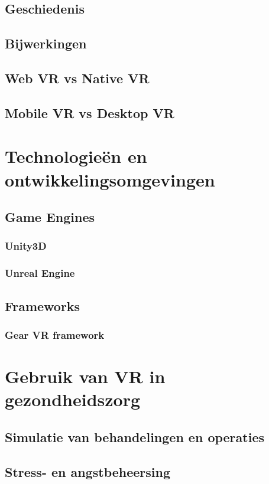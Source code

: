 \subsection{Geschiedenis}
\subsection{Bijwerkingen}
\subsection{Web VR vs Native VR}
\subsection{Mobile VR vs Desktop VR}

\section{Technologieën en ontwikkelingsomgevingen}
\subsection{Game Engines}
\subsubsection{Unity3D}
\subsubsection{Unreal Engine}
\subsection{Frameworks}
\subsubsection{Gear VR framework}

\section{Gebruik van VR in gezondheidszorg}
\subsection{Simulatie van behandelingen en operaties}
\subsection{Stress- en angstbeheersing}  
